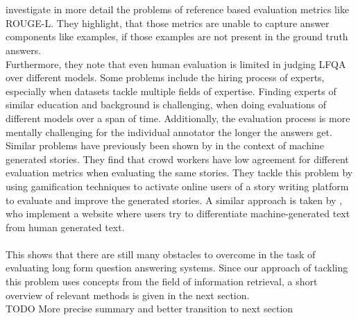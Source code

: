 \\\\
\cite{krishna:2021} investigate in more detail the problems of reference based evaluation metrics like ROUGE-L. 
They highlight, that those metrics are unable to capture answer components like examples, if those examples are not present in the ground truth answers. 
\\
Furthermore, they note that even human evaluation is limited in judging LFQA over different models.
Some problems include the hiring process of experts, especially when datasets tackle multiple fields of expertise.
Finding experts of similar education and background is challenging, when doing evaluations of different models over a span of time.
Additionally, the evaluation process is more mentally challenging for the individual annotator the longer the answers get.
Similar problems have previously been shown by \cite{akoury:2020} in the context of machine generated stories.
They find that crowd workers have low agreement for different evaluation metrics when evaluating the same stories.
They tackle this problem by using gamification techniques to activate online users of a story writing platform to evaluate and improve the generated stories.
A similar approach is taken by \cite{dugan:2020}, who implement a website where users try to differentiate machine-generated text from human generated text.
\\\\
This shows that there are still many obstacles to overcome in the task of evaluating long form question answering systems.
Since our approach of tackling this problem uses concepts from the field of information retrieval, a short overview of relevant methods is given in the next section.
\\
TODO More precise summary and better transition to next section

